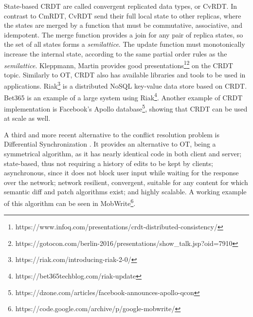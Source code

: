 State-based CRDT are called convergent replicated data types, or CvRDT. In contrast to CmRDT, CvRDT send their full local state to other replicas, where the states are merged by a function that must be commutative, associative, and idempotent. The merge function provides a join for any pair of replica states, so the set of all states forms a \textit{semilattice}. The update function must monotonically increase the internal state, according to the same partial order rules as the \textit{semilattice}. Kleppmann, Martin provides good presentations\footnote{https://www.infoq.com/presentations/crdt-distributed-consistency/}\footnote{https://gotocon.com/berlin-2016/presentations/show\_talk.jsp?oid=7910} on the CRDT topic. Similarly to OT, CRDT also has available libraries and tools to be used in applications. Riak\footnote{https://riak.com/introducing-riak-2-0/} is a distributed NoSQL key-value data store based on CRDT. Bet365 is an example of a large system using Riak\footnote{https://bet365techblog.com/riak-update}. Another example of CRDT implementation is Facebook's Apollo database\footnote{https://dzone.com/articles/facebook-announces-apollo-qcon}, showing that CRDT can be used at scale as well.

A third and more recent alternative to the conflict resolution problem is Differential Synchronization \cite{Fraser2009} \cite{Fraser-diff-sync-web}. It provides an alternative to OT, being a symmetrical algorithm, as it has nearly identical code in both client and server; state-based, thus not requiring a history of edits to be kept by clients; asynchronous, since it does not block user input while waiting for the response over the network; network resilient, convergent, suitable for any content for which semantic diff and patch algorithms exist; and highly scalable. A working example of this algorithm can be seen in MobWrite\footnote{https://code.google.com/archive/p/google-mobwrite/}.

